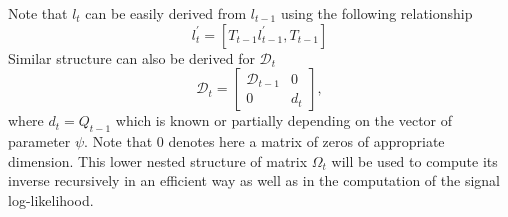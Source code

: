 \documentclass{article}
\begin{document}
Note that $l_t$ can be easily derived from $l_{t-1}$ using the following relationship
\begin{equation*}
  l_t^\prime = [T_{t-1}l_{t-1}^\prime, T_{t-1}]
\end{equation*}
Similar structure can also be derived for $\mathcal{D}_t$
\begin{equation*}
  \mathcal{D}_t
  =
  \begin{bmatrix}
    \mathcal{D}_{t-1} & 0 \\
    0 & d_t
  \end{bmatrix}
  ,
\end{equation*}
where $d_t=Q_{t-1}$ which is known or partially depending on the vector of parameter
$\psi$. Note that $0$ denotes here a matrix of zeros of appropriate dimension. This lower
nested structure of matrix $\Omega_t$ will be used to compute its inverse recursively in an
efficient way as well as in the computation of the signal log-likelihood.
\end{document}
